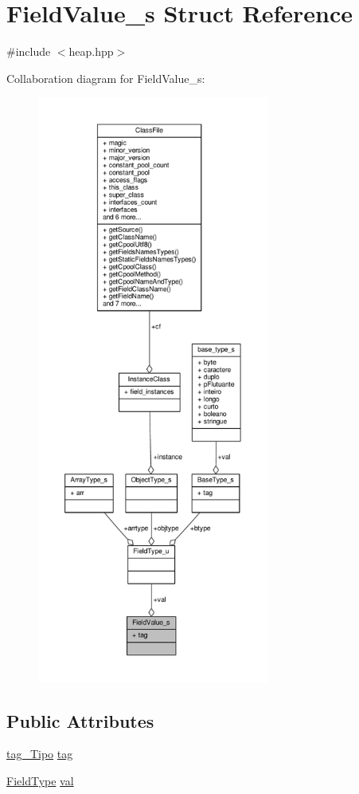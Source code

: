 \hypertarget{structFieldValue__s}{\section{Field\+Value\+\_\+s Struct Reference}
\label{structFieldValue__s}
}


{\ttfamily \#include $<$heap.\+hpp$>$}



Collaboration diagram for Field\+Value\+\_\+s\+:
\nopagebreak
\begin{figure}[H]
\begin{center}
\leavevmode
\includegraphics[height=550pt]{structFieldValue__s__coll__graph}
\end{center}
\end{figure}
\subsection*{Public Attributes}
\begin{DoxyCompactItemize}
\item 
\hyperlink{heap_8hpp_abae472b4761acff5c0e2e945a106d1a0}{tag\+\_\+\+Tipo} \hyperlink{structFieldValue__s_a5ed4ddbdf09864eaf6534ef990668f7f}{tag}
\item 
\hyperlink{heap_8hpp_a64fe1bf0d5bb9b0891062127bc036b49}{Field\+Type} \hyperlink{structFieldValue__s_ac455e65e22ca6f532307266c8d1bbcd0}{val}
\end{DoxyCompactItemize}


